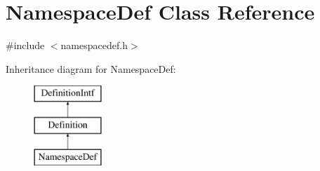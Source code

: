 \hypertarget{class_namespace_def}{}\section{Namespace\+Def Class Reference}
\label{class_namespace_def}


{\ttfamily \#include $<$namespacedef.\+h$>$}

Inheritance diagram for Namespace\+Def\+:\begin{figure}[H]
\begin{center}
\leavevmode
\includegraphics[height=3.000000cm]{class_namespace_def}
\end{center}
\end{figure}
